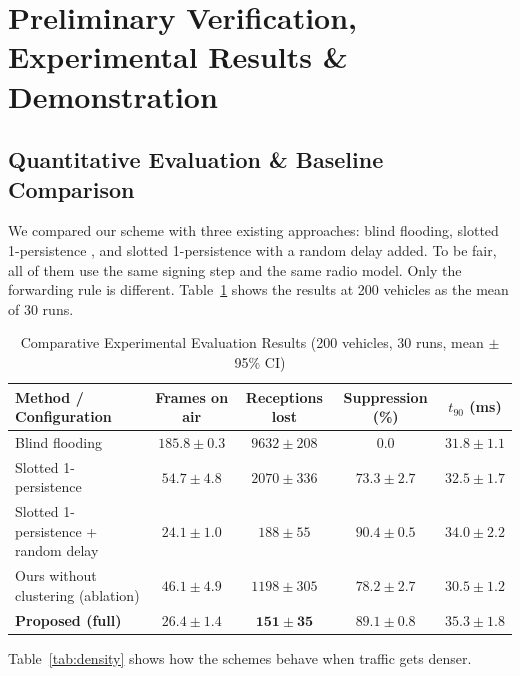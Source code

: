 \documentclass[11pt, a4paper]{article}
\begin{document}
\section{Preliminary Verification, Experimental Results \& Demonstration}

\subsection{Quantitative Evaluation \& Baseline Comparison}
\noindent
We compared our scheme with three existing approaches: blind flooding, slotted 1-persistence \cite{wisitpongphan2007}, and slotted 1-persistence with a random delay added. To be fair, all of them use the same signing step and the same radio model. Only the forwarding rule is different. Table~\ref{tab:main} shows the results at 200 vehicles as the mean of 30 runs.

\begin{table}[H]
    \centering
    \footnotesize
    \renewcommand{\arraystretch}{1.25}
    \begin{tabular}{|p{5.0cm}|c|c|c|c|}
        \hline
        \textbf{Method / Configuration} & \textbf{Frames on air} & \textbf{Receptions lost} & \textbf{Suppression (\%)} & \textbf{$t_{90}$ (ms)} \\
        \hline
        Blind flooding & $185.8 \pm 0.3$ & $9632 \pm 208$ & 0.0 & $31.8 \pm 1.1$ \\
        \hline
        Slotted 1-persistence \cite{wisitpongphan2007} & $54.7 \pm 4.8$ & $2070 \pm 336$ & $73.3 \pm 2.7$ & $32.5 \pm 1.7$ \\
        \hline
        Slotted 1-persistence + random delay & $24.1 \pm 1.0$ & $188 \pm 55$ & $90.4 \pm 0.5$ & $34.0 \pm 2.2$ \\
        \hline
        Ours without clustering (ablation) & $46.1 \pm 4.9$ & $1198 \pm 305$ & $78.2 \pm 2.7$ & $30.5 \pm 1.2$ \\
        \hline
        \textbf{Proposed (full)} & $\mathbf{26.4 \pm 1.4}$ & $\mathbf{151 \pm 35}$ & $\mathbf{89.1 \pm 0.8}$ & $\mathbf{35.3 \pm 1.8}$ \\
        \hline
    \end{tabular}
    \caption{Comparative Experimental Evaluation Results (200 vehicles, 30 runs, mean $\pm$ 95\% CI)}
    \label{tab:main}
\end{table}

\noindent
Table~\ref{tab:density} shows how the schemes behave when traffic gets denser.
\end{document}
